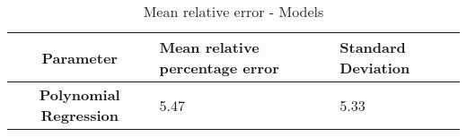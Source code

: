 \begin{table}[h!]
  \centering
  \begin{tabularx}{\textwidth}{||c|X|X||}
  \hline
    \cellcolor{gray!20}\textbf{Parameter} & \cellcolor{gray!20}\textbf{Mean relative percentage error} & \cellcolor{gray!20}\textbf{Standard Deviation} \\ [0.5ex]
  \hline\hline
\centering
    \cellcolor{gray!20}\textbf{Polynomial Regression} & 5.47 & 5.33 \\
  \hline
  \end{tabularx}
  \caption{Mean relative error - Models}
  \label{meanEM}
\end{table}
